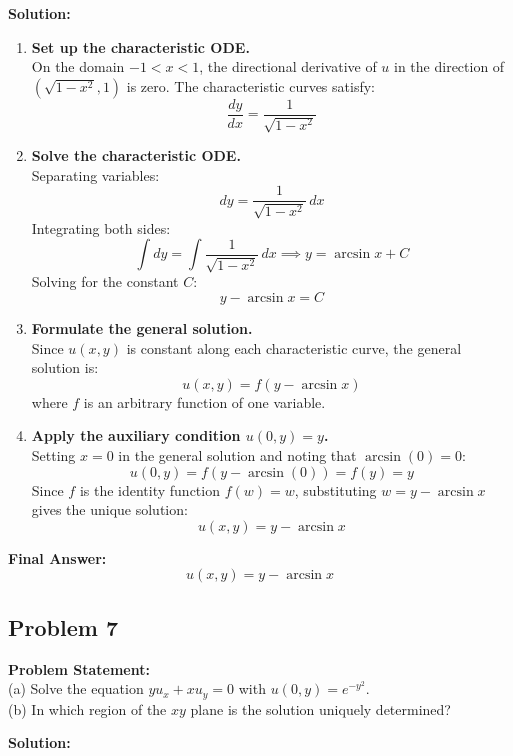 \documentclass[11pt]{article}
\begin{document}
\textbf{Solution:}
\begin{enumerate}[label=\textbf{Step \arabic*:}]
    \item \textbf{Set up the characteristic ODE.} \\
    On the domain $-1 < x < 1$, the directional derivative of $u$ in the direction of $(\sqrt{1 - x^2}, 1)$ is zero. The characteristic curves satisfy:
    \[
    \frac{dy}{dx} = \frac{1}{\sqrt{1 - x^2}}
    \]

    \item \textbf{Solve the characteristic ODE.} \\
    Separating variables:
    \[
    dy = \frac{1}{\sqrt{1 - x^2}}\,dx
    \]
    Integrating both sides:
    \[
    \int dy = \int \frac{1}{\sqrt{1 - x^2}}\,dx \implies y = \arcsin x + C
    \]
    Solving for the constant $C$:
    \[
    y - \arcsin x = C
    \]

    \item \textbf{Formulate the general solution.} \\
    Since $u(x, y)$ is constant along each characteristic curve, the general solution is:
    \[
    u(x, y) = f(y - \arcsin x)
    \]
    where $f$ is an arbitrary function of one variable.

    \item \textbf{Apply the auxiliary condition $u(0, y) = y$.} \\
    Setting $x = 0$ in the general solution and noting that $\arcsin(0) = 0$:
    \[
    u(0, y) = f(y - \arcsin(0)) = f(y) = y
    \]
    Since $f$ is the identity function $f(w) = w$, substituting $w = y - \arcsin x$ gives the unique solution:
    \[
    u(x, y) = y - \arcsin x
    \]
\end{enumerate}

\noindent\textbf{Final Answer:}
\[
\boxed{u(x, y) = y - \arcsin x}
\]

\hrulefill

\subsection*{Problem 7}
\textbf{Problem Statement:} \\
(a) Solve the equation $yu_x + xu_y = 0$ with $u(0, y) = e^{-y^2}$. \\
(b) In which region of the $xy$ plane is the solution uniquely determined?

\textbf{Solution:}
\end{document}
